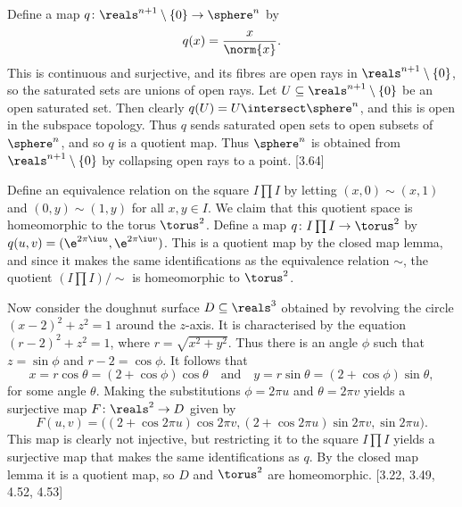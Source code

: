 \documentclass[article, a4paper, 11pt, oneside]{memoir}
\numberwithin{equation}{chapter}
\begin{document}
\begin{example}
    Define a map $q \colon \reals^{n+1} \setminus \{0\} \to \sphere^n$ by
    \begin{equation*}
        q(x)
            = \frac{x}{\norm{x}}.
    \end{equation*}
    This is continuous and surjective, and its fibres are open rays in $\reals^{n+1} \setminus \{0\}$, so the saturated sets are unions of open rays. Let $U \subseteq \reals^{n+1} \setminus \{0\}$ be an open saturated set. Then clearly $q(U) = U \intersect \sphere^n$, and this is open in the subspace topology. Thus $q$ sends saturated open sets to open subsets of $\sphere^n$, and so $q$ is a quotient map. Thus $\sphere^n$ is obtained from $\reals^{n+1} \setminus \{0\}$ by collapsing open rays to a point. [3.64]
\end{example}


\begin{example}[Tori]
    Define an equivalence relation on the square $I \prod I$ by letting $(x,0) \sim (x,1)$ and $(0,y) \sim (1,y)$ for all $x,y \in I$. We claim that this quotient space is homeomorphic to the torus $\torus^2$. Define a map $q \colon I \prod I \to \torus^2$ by $q(u,v) = (\e^{2\pi\iu u}, \e^{2\pi\iu v})$. This is a quotient map by the closed map lemma, and since it makes the same identifications as the equivalence relation $\sim$, the quotient $(I \prod I)/{\sim}$ is homeomorphic to $\torus^2$.
    
    Now consider the doughnut surface $D \subseteq \reals^3$ obtained by revolving the circle $(x-2)^2 + z^2 = 1$ around the $z$-axis. It is characterised by the equation $(r-2)^2 + z^2 = 1$, where $r = \sqrt{x^2 + y^2}$. Thus there is an angle $\phi$ such that $z = \sin\phi$ and $r-2 = \cos\phi$. It follows that
    \begin{equation*}
        x = r\cos\theta = (2 + \cos\phi) \cos\theta
        \quad \text{and} \quad
        y = r\sin\theta = (2 + \cos\phi) \sin\theta,
    \end{equation*}
    for some angle $\theta$. Making the substitutions $\phi = 2\pi u$ and $\theta = 2\pi v$ yields a surjective map $F \colon \reals^2 \to D$ given by
    \begin{equation*}
        F(u,v) = \bigl(
            (2 + \cos 2\pi u) \cos 2\pi v,
            (2 + \cos 2\pi u) \sin 2\pi v,
            \sin 2\pi u
        \bigr).
    \end{equation*}
    This map is clearly not injective, but restricting it to the square $I \prod I$ yields a surjective map that makes the same identifications as $q$. By the closed map lemma it is a quotient map, so $D$ and $\torus^2$ are homeomorphic. [3.22, 3.49, 4.52, 4.53]
\end{example}
\end{document}
